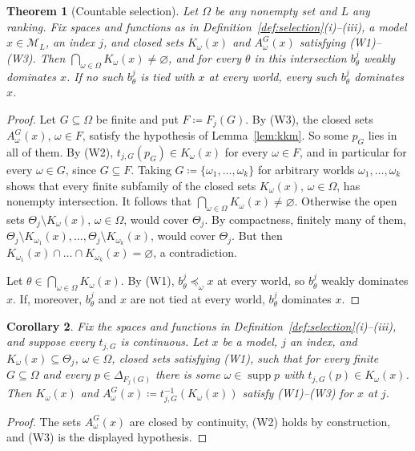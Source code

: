 \documentclass[11pt]{article}
\newtheorem{theorem}{Theorem}[section]
\newtheorem{corollary}[theorem]{Corollary}
\theoremstyle{definition}
\theoremstyle{remark}
\newcommand{\M}{\mathcal M}
\newcommand{\supp}{\operatorname{supp}}
\begin{document}
\begin{theorem}[Countable selection]\label{thm:general}
Let $\Omega$ be any nonempty set and $L$ any ranking. Fix spaces and functions as in Definition~\ref{def:selection}(i)--(iii), a model $x\in\M_L$, an index $j$, and closed sets $K_\omega(x)$ and $A^G_\omega(x)$ satisfying (W1)--(W3). Then $\bigcap_{\omega\in\Omega}K_\omega(x)\ne\varnothing$, and for every $\theta$ in this intersection $b^j_\theta$ weakly dominates $x$. {\color{red}If no such $b^j_\theta$ is tied with $x$ at every world, every such $b^j_\theta$ dominates $x$.}
\end{theorem}
\begin{proof}
Let $G\subseteq\Omega$ be finite and put $F\coloneqq F_j(G)$. By (W3), the closed sets $A^G_\omega(x)$, $\omega\in F$, satisfy the hypothesis of Lemma~\ref{lem:kkm}. So some $p_G$ lies in all of them. By (W2), $t_{j,G}(p_G)\in K_\omega(x)$ for every $\omega\in F$, and in particular for every $\omega\in G$, since $G\subseteq F$. Taking $G\coloneqq\{\omega_1,\dots,\omega_k\}$ for arbitrary worlds $\omega_1,\dots,\omega_k$ shows that every finite subfamily of the closed sets $K_\omega(x)$, $\omega\in\Omega$, has nonempty intersection. It follows that $\bigcap_{\omega\in\Omega}K_\omega(x)\ne\varnothing$. Otherwise the open sets $\Theta_j\setminus K_\omega(x)$, $\omega\in\Omega$, would cover $\Theta_j$. By compactness, finitely many of them, $\Theta_j\setminus K_{\omega_1}(x),\dots,\Theta_j\setminus K_{\omega_k}(x)$, would cover $\Theta_j$. But then $K_{\omega_1}(x)\cap\dots\cap K_{\omega_k}(x)=\varnothing$, a contradiction.

Let $\theta\in\bigcap_{\omega\in\Omega}K_\omega(x)$. By (W1), $b^j_\theta\preceq_\omega x$ at every world, so $b^j_\theta$ weakly dominates $x$. {\color{red}If, moreover, $b^j_\theta$ and $x$ are not tied at every world, $b^j_\theta$ dominates $x$.}
\end{proof}

\begin{corollary}\label{cor:inverse}
Fix the spaces and functions in Definition~\ref{def:selection}(i)--(iii), and suppose every $t_{j,G}$ is continuous. Let $x$ be a model, $j$ an index, and $K_\omega(x)\subseteq\Theta_j$, $\omega\in\Omega$, closed sets satisfying (W1), such that for every finite $G\subseteq\Omega$ and every $p\in\Delta_{F_j(G)}$ there is some $\omega\in\supp p$ with $t_{j,G}(p)\in K_\omega(x)$. Then $K_\omega(x)$ and $A^G_\omega(x)\coloneqq t_{j,G}^{-1}(K_\omega(x))$ satisfy (W1)--(W3) for $x$ at $j$.
\end{corollary}
\begin{proof}
The sets $A^G_\omega(x)$ are closed by continuity, (W2) holds by construction, and (W3) is the displayed hypothesis.
\end{proof}
\end{document}
